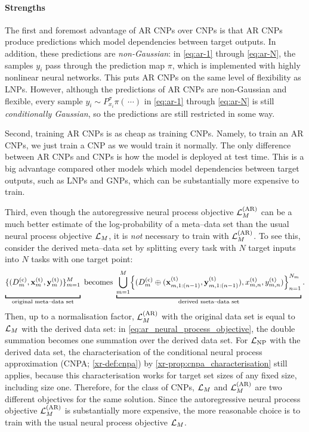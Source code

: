 \documentclass[12pt]{report}
\newcommand{\xrprefix}[1]{xr-#1}
\begin{document}
\paragraph{Strengths} The first and foremost advantage of AR CNPs over CNPs is that AR CNPs produce predictions which model dependencies between target outputs.
In addition, these predictions are \emph{non-Gaussian}:
in \eqref{eq:ar-1} through \eqref{eq:ar-N}, the samples $y_i$ pass through the prediction map $\pi$, which is implemented with highly nonlinear neural networks.
This puts AR CNPs on the same level of flexibility as LNPs.
However, although the predictions of AR CNPs are non-Gaussian and flexible, every sample $y_i \sim P^\sigma_{x_i} \pi(\,\cdots)$ in \eqref{eq:ar-1} through \eqref{eq:ar-N} is still \emph{conditionally Gaussian},
so the predictions are still restricted in some way.

Second, training AR CNPs is as cheap as training CNPs.
Namely, to train an AR CNPs, we just train a CNP as we would train it normally.
The only difference between AR CNPs and CNPs is how the model is deployed at test time.
This is a big advantage compared other models which model dependencies between target outputs, such as LNPs and GNPs, which can be substantially more expensive to train.

Third, even though the autoregressive neural process objective $\L\us{(AR)}_M$ can be a much better estimate of the log-probability of a meta--data set than the usual neural process objective $\mathcal{L}_M$, it is \emph{not} necessary to train with $\L\us{(AR)}_M$.
To see this, consider the derived meta--data set by splitting every task with $N$ target inputs into $N$ tasks with one target point:
\begin{equation*}
    \underbracket[1pt]{
        \vphantom{\union_{m=1}^M}
        \set{(D\us{(c)}_m, \vx\us{(t)}_m, \vy\us{(t)}_m)}_{m=1}^M
}_{\text{original meta--data set}}
    \;
    \text{becomes}
    \;
    \underbracket[1pt]{
        \union_{m=1}^M \set*{(D\us{(c)}_m \oplus (\vx\us{(t)}_{m,1:(n-1)}, \vy\us{(t)}_{m,1:(n-1)}), x\us{(t)}_{m,n}, y\us{(t)}_{m,n})}_{n=1}^{N_m}
    }_{\text{derived meta--data set}}
    .
\end{equation*}
Then, up to a normalisation factor, $\L\us{(AR)}_M$ with the original data set is equal to $\mathcal{L}_M$ with the derived data set:
in \eqref{eq:ar_neural_process_objective}, the double summation becomes one summation over the derived data set.
For $\L\ss{NP}$ with the derived data set, the characterisation of the conditional neural process approximation (CNPA; \cref{\xrprefix{def:cnpa}}) by \cref{\xrprefix{prop:cnpa_characterisation}} still applies, because this characterisation works for target set sizes of any fixed size, including size one.
Therefore, for the class of CNPs, $\mathcal{L}_M$ and $\L\us{(AR)}_M$ are two different objectives for the same solution.
Since the autoregressive neural process objective $\L\us{(AR)}_M$ is substantially more expensive, the more reasonable choice is to train with the usual neural process objective $\mathcal{L}_M$.
\end{document}
